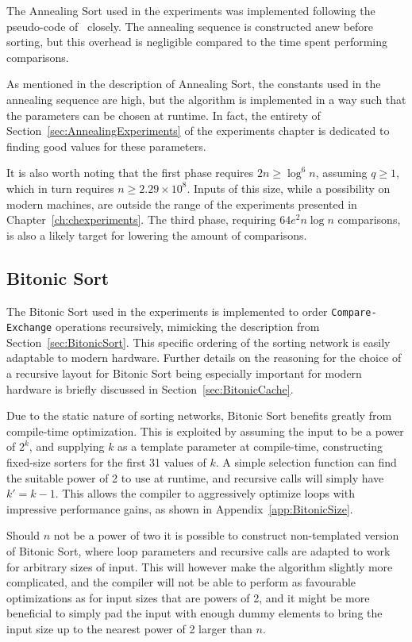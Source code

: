 The Annealing Sort used in the experiments was implemented following the pseudo-code of~ closely.
The annealing sequence is constructed anew before sorting, but this overhead is negligible compared to the time spent performing comparisons.

As mentioned in the description of Annealing Sort, the constants used in the annealing sequence are high, but the algorithm is implemented in a way such that the parameters can be chosen at runtime. In fact, the entirety of Section~\ref{sec:AnnealingExperiments} of the experiments chapter is dedicated to finding good values for these parameters.

It is also worth noting that the first phase requires $2n \geq \log^6n$, assuming $q \geq 1$, which in turn requires $n \geq 2.29 \times 10^8$. Inputs of this size, while a possibility on modern machines, are outside the range of the experiments presented in Chapter~\ref{ch:chexperiments}. The third phase, requiring $64e^2 n \log n$ comparisons, is also a likely target for lowering the amount of comparisons.

\subsection{Bitonic Sort}
\label{sec:BitonicImplementation}

The Bitonic Sort used in the experiments is implemented to order \texttt{Compare-Exchange} operations recursively, mimicking the description from Section~\ref{sec:BitonicSort}. This specific ordering of the sorting network is easily adaptable to modern hardware. Further details on the reasoning for the choice of a recursive layout for Bitonic Sort being especially important for modern hardware is briefly discussed in Section~\ref{sec:BitonicCache}.

Due to the static nature of sorting networks, Bitonic  Sort benefits greatly from compile-time optimization.
This is exploited  by assuming the input to be a power of $2^k$, and supplying $k$ as a template parameter at compile-time, constructing fixed-size sorters for the first 31 values of $k$. A simple selection function can find the suitable power of 2 to use at runtime, and recursive calls will simply have $k' = k-1$. This allows the compiler to aggressively optimize loops with impressive performance gains, as shown in Appendix~\ref{app:BitonicSize}.

Should $n$ not be a power of two it is possible to construct non-templated version of Bitonic Sort, where loop parameters and recursive calls are adapted to work for arbitrary sizes of input. 
This will however make the algorithm slightly more complicated, and the compiler will not be able to perform as favourable optimizations as for input sizes that are powers of 2, and it might be more beneficial to simply pad the input with enough dummy elements to bring the input size up to the nearest power of 2 larger than $n$.

